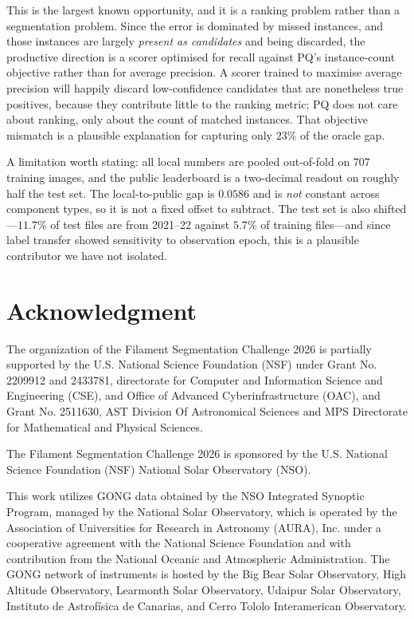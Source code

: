 \documentclass[sigconf]{acmart}
\begin{document}
    This is the largest known opportunity, and it is a ranking problem rather than a segmentation problem. Since the error is dominated by missed instances, and those instances are largely \emph{present as candidates} and being discarded, the productive direction is a scorer optimised for recall against PQ's instance-count objective rather than for average precision. A scorer trained to maximise average precision will happily discard low-confidence candidates that are nonetheless true positives, because they contribute little to the ranking metric; PQ does not care about ranking, only about the count of matched instances. That objective mismatch is a plausible explanation for capturing only $23\%$ of the oracle gap.

    A limitation worth stating: all local numbers are pooled out-of-fold on 707 training images, and the public leaderboard is a two-decimal readout on roughly half the test set. The local-to-public gap is $0.0586$ and is \emph{not} constant across component types, so it is not a fixed offset to subtract. The test set is also shifted---$11.7\%$ of test files are from 2021--22 against $5.7\%$ of training files---and since label transfer showed sensitivity to observation epoch, this is a plausible contributor we have not isolated.



\section{Acknowledgment}\label{sec:acknowledgment}
    The organization of the Filament Segmentation Challenge 2026 is partially supported by the U.S. National Science Foundation (NSF) under Grant No. 2209912 and 2433781, directorate for Computer and Information Science and Engineering (CSE), and Office of Advanced Cyberinfrastructure (OAC), and Grant No. 2511630, AST Division Of Astronomical Sciences and MPS Directorate for Mathematical and Physical Sciences.

    The Filament Segmentation Challenge 2026 is sponsored by the U.S. National Science Foundation (NSF) National Solar Observatory (NSO). 

    This work utilizes GONG data obtained by the NSO Integrated Synoptic Program, managed by the National Solar Observatory, which is operated by the Association of Universities for Research in Astronomy (AURA), Inc. under a cooperative agreement with the National Science Foundation and with contribution from the National Oceanic and Atmospheric Administration. The GONG network of instruments is hosted by the Big Bear Solar Observatory, High Altitude Observatory, Learmonth Solar Observatory, Udaipur Solar Observatory, Instituto de Astrofísica de Canarias, and Cerro Tololo Interamerican Observatory.



\end{document}

